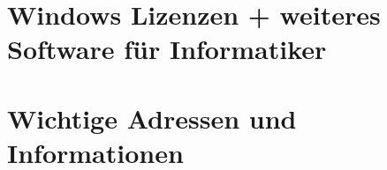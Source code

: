 \documentclass[a4paper,12pt]{scrartcl}
\newcommand{\spaltenanfang}{\begin{multicols}{2}}
\newcommand{\spaltenende}{\end{multicols}}
\begin{document}

\newpage



\section{Windows Lizenzen + weiteres Software für Informatiker}



\newpage
\begin{center}
\end{center}


\newpage
\section{Wichtige Adressen und Informationen}

\spaltenanfang

\spaltenende



%


%



\end{document}
